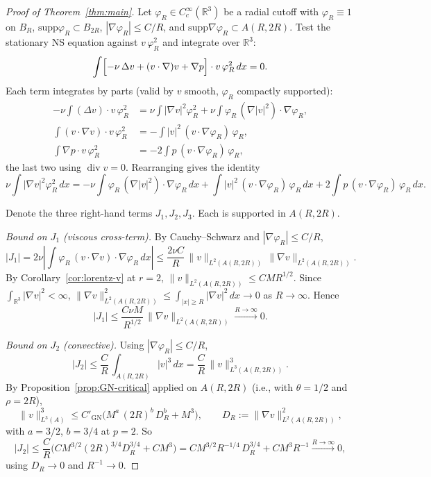 \documentclass[11pt]{amsart}
\theoremstyle{definition}
\newcommand{\RR}{\mathbb{R}}
\newcommand{\DD}{D}              %
\newcommand{\norm}[1]{\|#1\|}
\newcommand{\abs}[1]{|#1|}
\newcommand{\supp}{\mathrm{supp}}
\DeclareMathOperator{\dv}{div}
\begin{document}
\begin{proof}[Proof of Theorem~\ref{thm:main}]
Let $\varphi_R \in C^\infty_c(\RR^3)$ be a radial cutoff with
$\varphi_R \equiv 1$ on $B_R$, $\supp \varphi_R \subset B_{2R}$,
$\abs{\nabla \varphi_R} \leq C/R$, and $\supp \nabla\varphi_R
\subset A(R, 2R)$. Test the stationary NS equation against
$v\,\varphi_R^2$ and integrate over $\RR^3$:
\[
\int \Bigl[-\nu\,\Delta v + (v\cdot\nabla)v + \nabla p\Bigr] \cdot v\,\varphi_R^2 \,dx = 0.
\]
Each term integrates by parts (valid by $v$ smooth, $\varphi_R$
compactly supported):
\begin{align*}
-\nu \int (\Delta v) \cdot v\,\varphi_R^2
&= \nu \int \abs{\nabla v}^2 \varphi_R^2 + \nu \int \varphi_R\,(\nabla\abs{v}^2) \cdot \nabla\varphi_R, \\
\int (v\cdot\nabla v) \cdot v\,\varphi_R^2
&= -\int \abs{v}^2\,(v \cdot \nabla\varphi_R)\,\varphi_R, \\
\int \nabla p \cdot v\,\varphi_R^2
&= -2\int p\,(v\cdot\nabla\varphi_R)\,\varphi_R,
\end{align*}
the last two using $\dv v = 0$. Rearranging gives the identity
\begin{equation}\label{eq:closing}
\nu \int \abs{\nabla v}^2 \varphi_R^2\, dx
= -\nu\int \varphi_R\,(\nabla\abs{v}^2)\cdot\nabla\varphi_R\,dx
+ \int \abs{v}^2\,(v\cdot\nabla\varphi_R)\,\varphi_R\, dx
+ 2\int p\,(v\cdot\nabla\varphi_R)\,\varphi_R\,dx.
\end{equation}

Denote the three right-hand terms $J_1, J_2, J_3$. Each is
supported in $A(R, 2R)$.

\emph{Bound on $J_1$ (viscous cross-term).} By Cauchy--Schwarz
and $\abs{\nabla \varphi_R} \leq C/R$,
\[
\abs{J_1} = 2\nu \abs{\int \varphi_R\,(v \cdot \nabla v)\cdot\nabla\varphi_R\,dx}
\leq \frac{2\nu C}{R}\,\norm{v}_{L^2(A(R,2R))}\,\norm{\nabla v}_{L^2(A(R, 2R))}.
\]
By Corollary~\ref{cor:lorentz-v} at $r = 2$,
$\norm{v}_{L^2(A(R,2R))} \leq C M R^{1/2}$. Since
$\int_{\RR^3}\abs{\nabla v}^2 < \infty$,
$\norm{\nabla v}_{L^2(A(R,2R))}^2 \leq \int_{\abs{x} \geq R}
\abs{\nabla v}^2\,dx \to 0$ as $R \to \infty$. Hence
\[
\abs{J_1} \leq \frac{C\nu M}{R^{1/2}}\,\norm{\nabla v}_{L^2(A(R,2R))}
\xrightarrow{R\to\infty} 0.
\]

\emph{Bound on $J_2$ (convective).} Using
$\abs{\nabla\varphi_R} \leq C/R$,
\[
\abs{J_2} \leq \frac{C}{R}\,\int_{A(R, 2R)} \abs{v}^3\,dx
= \frac{C}{R}\,\norm{v}_{L^3(A(R, 2R))}^3.
\]
By Proposition~\ref{prop:GN-critical} applied on
$A(R, 2R)$ (i.e., with $\theta = 1/2$ and $\rho = 2R$),
\[
\norm{v}_{L^3(A)}^3 \leq C'_{\mathrm{GN}}\bigl(M^a\,(2R)^b\,\DD_R^b + M^3\bigr),
\qquad \DD_R := \norm{\nabla v}_{L^2(A(R, 2R))}^2,
\]
with $a = 3/2$, $b = 3/4$ at $p = 2$. So
\[
\abs{J_2} \leq \frac{C}{R}\bigl(CM^{3/2}(2R)^{3/4}\DD_R^{3/4} + CM^3\bigr)
= C M^{3/2} R^{-1/4}\,\DD_R^{3/4} + C M^3 R^{-1} \xrightarrow{R\to\infty} 0,
\]
using $\DD_R \to 0$ and $R^{-1} \to 0$.


\end{proof}
\end{document}
